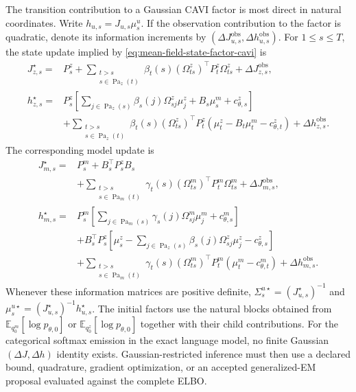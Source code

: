 The transition contribution to a Gaussian CAVI factor is most direct in natural coordinates. Write $h_{u,s}=J_{u,s}\mu_s^u$. If the observation contribution to the factor is quadratic, denote its information increments by $(\Delta J_{u,s}^{\mathrm{obs}},\Delta h_{u,s}^{\mathrm{obs}})$. For $1\leq s\leq T$, the state update implied by \cref{eq:mean-field-state-factor-cavi} is
\begin{equation}
\begin{aligned}
J_{z,s}^\star
={}&P_s^z
+\sum_{\substack{t>s\\s\in\operatorname{Pa}_z(t)}}
\beta_t(s)(\Omega_{ts}^z)^\top P_t^z\Omega_{ts}^z
+\Delta J_{z,s}^{\mathrm{obs}},\\
h_{z,s}^\star
={}&P_s^z\left[
\sum_{j\in\operatorname{Pa}_z(s)}
\beta_s(j)\Omega_{sj}^z\mu_j^z
+B_s\mu_s^m+c_{\theta,s}^z
\right]\\
&+\sum_{\substack{t>s\\s\in\operatorname{Pa}_z(t)}}
\beta_t(s)(\Omega_{ts}^z)^\top P_t^z
\left(
\mu_t^z-B_t\mu_t^m-c_{\theta,t}^z
\right)
+\Delta h_{z,s}^{\mathrm{obs}}.
\end{aligned}
\label{eq:mean-field-state-natural-update}
\end{equation}
The corresponding model update is
\begin{equation}
\begin{aligned}
J_{m,s}^\star
={}&P_s^m+B_s^\top P_s^zB_s\\
&+\sum_{\substack{t>s\\s\in\operatorname{Pa}_m(t)}}
\gamma_t(s)(\Omega_{ts}^m)^\top P_t^m\Omega_{ts}^m
+\Delta J_{m,s}^{\mathrm{obs}},\\
h_{m,s}^\star
={}&P_s^m\left[
\sum_{j\in\operatorname{Pa}_m(s)}
\gamma_s(j)\Omega_{sj}^m\mu_j^m
+c_{\theta,s}^m
\right]\\
&+B_s^\top P_s^z\left[
\mu_s^z
-\sum_{j\in\operatorname{Pa}_z(s)}
\beta_s(j)\Omega_{sj}^z\mu_j^z
-c_{\theta,s}^z
\right]\\
&+\sum_{\substack{t>s\\s\in\operatorname{Pa}_m(t)}}
\gamma_t(s)(\Omega_{ts}^m)^\top P_t^m
\left(
\mu_t^m-c_{\theta,t}^m
\right)
+\Delta h_{m,s}^{\mathrm{obs}}.
\end{aligned}
\label{eq:mean-field-model-natural-update}
\end{equation}
Whenever these information matrices are positive definite, $\Sigma_s^{u\star}=(J_{u,s}^\star)^{-1}$ and $\mu_s^{u\star}=(J_{u,s}^\star)^{-1}h_{u,s}^\star$. The initial factors use the natural blocks obtained from $\mathbb E_{q_0^m}[\log p_{\theta,0}]$ or $\mathbb E_{q_0^z}[\log p_{\theta,0}]$ together with their child contributions. For the categorical softmax emission in the exact language model, no finite Gaussian $(\Delta J,\Delta h)$ identity exists. Gaussian-restricted inference must then use a declared bound, quadrature, gradient optimization, or an accepted generalized-EM proposal evaluated against the complete ELBO.

